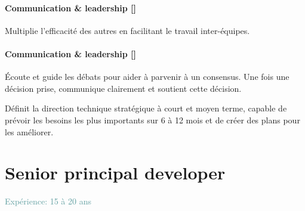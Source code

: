 \documentclass[a4paper, french, openany, 12pt]{book}
\newcommand\cha{\textcolor{RawSienna}{\textbf{Communication \& leadership [\bsc{CHA}]}}}
\newcommand\xp[1]{\textcolor{CadetBlue}{Expérience: {#1} ans}}
\begin{document}
\begin{multicols}{2}
  \subsubsection*{\cha}

  Multiplie l'efficacité des autres en facilitant le travail inter-équipes.

  \subsubsection*{\cha}

  Écoute et guide les débats pour aider à parvenir à un consensus.
  Une fois une décision prise, communique clairement et soutient cette décision.

  Définit la direction technique stratégique à court et moyen terme, capable de prévoir les besoins les plus importants 
  sur 6 à 12 mois et de créer des plans pour les améliorer.

\end{multicols}

\chapter{Senior principal developer}

\xp{15 à 20}
\end{document}
